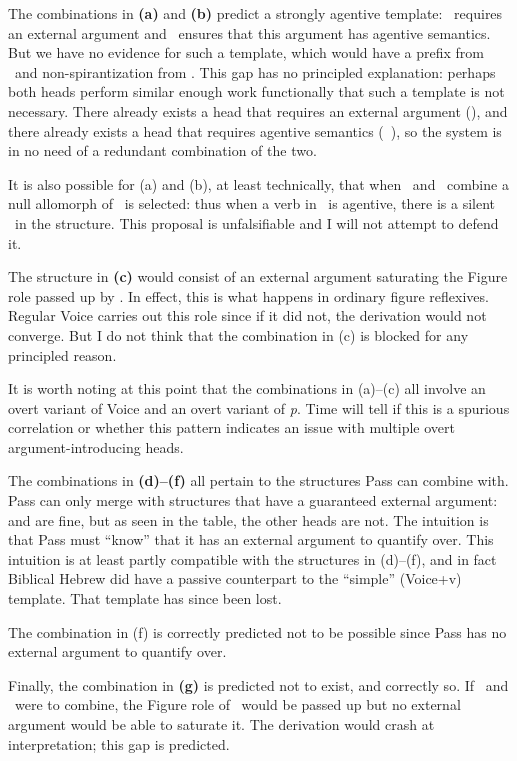 The combinations in \textbf{(a)} and \textbf{(b)} predict a strongly agentive template: \vd~requires an external argument and \va~ensures that this argument has agentive semantics. But we have no evidence for such a template, which would have a prefix from \vd~and non-spirantization from \va. This gap has no principled explanation: perhaps both heads perform similar enough work functionally that such a template is not necessary. There already exists a head that requires an external argument (\vd), and there already exists a head that requires agentive semantics (\va~\!), so the system is in no need of a redundant combination of the two.

It is also possible for (a) and (b), at least technically, that when \vd~and \va~combine a null allomorph of \va~is selected: thus when a verb in \thif~is agentive, there is a silent \va~in the structure. This proposal is unfalsifiable and I will not attempt to defend it.

The structure in \textbf{(c)} would consist of an external argument saturating the Figure role passed up by \pz. In effect, this is what happens in ordinary figure reflexives. Regular Voice carries out this role since if it did not, the derivation would not converge. But I do not think that the combination in (c) is blocked for any principled reason.

It is worth noting at this point that the combinations in (a)--(c) all involve an overt variant of Voice and an overt variant of \emph{p}. Time will tell if this is a spurious correlation or whether this pattern indicates an issue with multiple overt argument-introducing heads.

The combinations in \textbf{(d)--(f)} all pertain to the structures Pass can combine with. Pass can only merge with structures that have a guaranteed external argument: {\vd} and {\va} are fine, but as seen in the table, the other heads are not. The intuition is that Pass must ``know'' that it has an external argument to quantify over. This intuition is at least partly compatible with the structures in (d)--(f), and in fact Biblical Hebrew did have a passive counterpart to the ``simple'' (Voice+v) template. That template has since been lost.

The combination in (f) is correctly predicted not to be possible since Pass has no external argument to quantify over.

Finally, the combination in \textbf{(g)} is predicted not to exist, and correctly so. If \vz~and \pz~were to combine, the Figure role of \pz~would be passed up but no external argument would be able to saturate it. The derivation would crash at interpretation; this gap is predicted.

